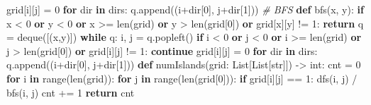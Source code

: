 \documentclass[
]{article}
\newenvironment{Shaded}{}{}
\newcommand{\BuiltInTok}[1]{#1}
\newcommand{\CommentTok}[1]{\textcolor[rgb]{0.38,0.63,0.69}{\textit{#1}}}
\newcommand{\ControlFlowTok}[1]{\textcolor[rgb]{0.00,0.44,0.13}{\textbf{#1}}}
\newcommand{\DecValTok}[1]{\textcolor[rgb]{0.25,0.63,0.44}{#1}}
\newcommand{\KeywordTok}[1]{\textcolor[rgb]{0.00,0.44,0.13}{\textbf{#1}}}
\newcommand{\NormalTok}[1]{#1}
\newcommand{\OperatorTok}[1]{\textcolor[rgb]{0.40,0.40,0.40}{#1}}
\newcommand{\StringTok}[1]{\textcolor[rgb]{0.25,0.44,0.63}{#1}}
\begin{document}
\begin{Shaded}
\begin{Highlighting}[]
\NormalTok{    grid[i][j] }\OperatorTok{=} \StringTok{\textquotesingle{}0\textquotesingle{}}
    \ControlFlowTok{for} \BuiltInTok{dir} \KeywordTok{in}\NormalTok{ dirs:}
\NormalTok{      q.append((i}\OperatorTok{+}\BuiltInTok{dir}\NormalTok{[}\DecValTok{0}\NormalTok{], j}\OperatorTok{+}\BuiltInTok{dir}\NormalTok{[}\DecValTok{1}\NormalTok{]))}
\CommentTok{\# BFS}
\KeywordTok{def}\NormalTok{ bfs(x, y):}
  \ControlFlowTok{if}\NormalTok{ x }\OperatorTok{\textless{}} \DecValTok{0} \KeywordTok{or}\NormalTok{ y }\OperatorTok{\textless{}} \DecValTok{0} \KeywordTok{or}\NormalTok{ x }\OperatorTok{\textgreater{}=} \BuiltInTok{len}\NormalTok{(grid) }\KeywordTok{or}\NormalTok{ y }\OperatorTok{\textgreater{}} \BuiltInTok{len}\NormalTok{(grid[}\DecValTok{0}\NormalTok{]) }\KeywordTok{or}\NormalTok{ grid[x][y] }\OperatorTok{!=} \StringTok{\textquotesingle{}1\textquotesingle{}}\NormalTok{: }\ControlFlowTok{return}
\NormalTok{  q }\OperatorTok{=}\NormalTok{ deque([(x,y)])}
  \ControlFlowTok{while}\NormalTok{ q: }
\NormalTok{    i, j }\OperatorTok{=}\NormalTok{ q.popleft()}
    \ControlFlowTok{if}\NormalTok{ i }\OperatorTok{\textless{}} \DecValTok{0} \KeywordTok{or}\NormalTok{ j }\OperatorTok{\textless{}} \DecValTok{0} \KeywordTok{or}\NormalTok{ i }\OperatorTok{\textgreater{}=} \BuiltInTok{len}\NormalTok{(grid) }\KeywordTok{or}\NormalTok{ j }\OperatorTok{\textgreater{}} \BuiltInTok{len}\NormalTok{(grid[}\DecValTok{0}\NormalTok{]) }\KeywordTok{or}\NormalTok{ grid[i][j] }\OperatorTok{!=} \StringTok{\textquotesingle{}1\textquotesingle{}}\NormalTok{: }\ControlFlowTok{continue}
\NormalTok{    grid[i][j] }\OperatorTok{=} \StringTok{\textquotesingle{}0\textquotesingle{}}
    \ControlFlowTok{for} \BuiltInTok{dir} \KeywordTok{in}\NormalTok{ dirs:}
\NormalTok{      q.append((i}\OperatorTok{+}\BuiltInTok{dir}\NormalTok{[}\DecValTok{0}\NormalTok{], j}\OperatorTok{+}\BuiltInTok{dir}\NormalTok{[}\DecValTok{1}\NormalTok{]))}
\KeywordTok{def}\NormalTok{ numIslands(grid: List[List[}\BuiltInTok{str}\NormalTok{]]) }\OperatorTok{{-}\textgreater{}} \BuiltInTok{int}\NormalTok{:}
\NormalTok{  cnt }\OperatorTok{=} \DecValTok{0}
  \ControlFlowTok{for}\NormalTok{ i }\KeywordTok{in} \BuiltInTok{range}\NormalTok{(}\BuiltInTok{len}\NormalTok{(grid)):}
    \ControlFlowTok{for}\NormalTok{ j }\KeywordTok{in} \BuiltInTok{range}\NormalTok{(}\BuiltInTok{len}\NormalTok{(grid[}\DecValTok{0}\NormalTok{])):}
      \ControlFlowTok{if}\NormalTok{ grid[i][j] }\OperatorTok{==} \StringTok{\textquotesingle{}1\textquotesingle{}}\NormalTok{:}
\NormalTok{        dfs(i, j)  }\OperatorTok{/}\NormalTok{ bfs(i, j)}
\NormalTok{      	cnt }\OperatorTok{+=} \DecValTok{1}
  \ControlFlowTok{return}\NormalTok{ cnt}
\end{Highlighting}
\end{Shaded}
\end{document}
